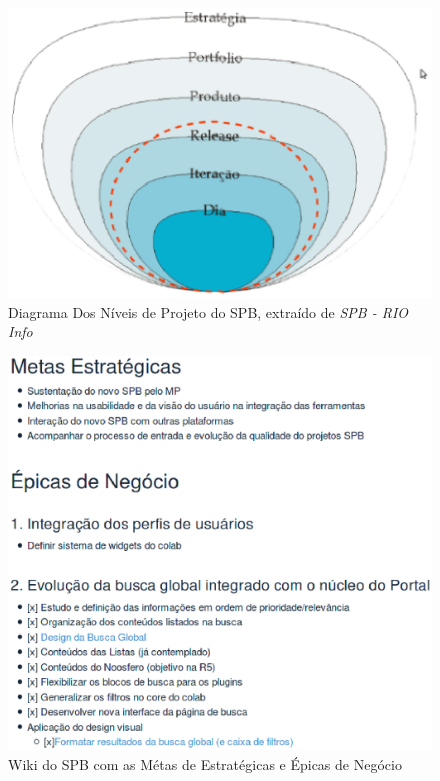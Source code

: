 \begin{figure}[!h]
    \centering
        \includegraphics[keepaspectratio=true,scale=0.7]{figuras/spb-layers.eps}
    \caption{Diagrama Dos Níveis de Projeto do SPB, extraído de \textit{SPB - RIO Info}}
    \label{fig:spb-layers}
\end{figure}

\begin{figure}[!h]
    \centering
        \includegraphics[keepaspectratio=true,scale=0.5]{figuras/wiki.eps}
    \caption{Wiki do SPB com as Métas de Estratégicas e Épicas de Negócio}
    \label{fig:epics-wiki}
\end{figure}

